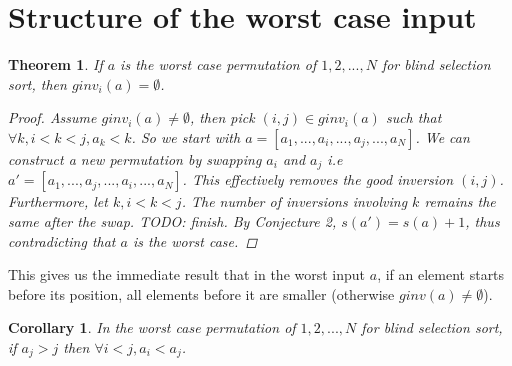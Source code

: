 \documentclass{article}
\newtheorem{theorem}{Theorem}
\newtheorem{corollary}{Corollary}
\begin{document}
\section{Structure of the worst case input}
\begin{theorem}
    If $a$ is the worst case permutation of $1, 2, ..., N$ for blind selection sort, then $ginv_i(a) = \emptyset$.
    \begin{proof}
        Assume $ginv_i(a) \neq \emptyset$, then pick $(i, j) \in ginv_i(a)$ such that $\forall k, i < k < j, a_k < k$.
        So we start with $a = [a_1, ... , a_i, ...,  a_j, ..., a_N]$. We can construct a new permutation by swapping $a_i$ and $a_j$
        i.e $a' = [a_1, ... , a_j, ...,  a_i, ..., a_N]$. This effectively removes the good inversion $(i, j)$.
        Furthermore, let $k, i < k < j$. The number of inversions involving $k$ remains the same after the swap. TODO: finish.
        By Conjecture 2, $s(a') = s(a) + 1$, thus contradicting that $a$ is the worst case.
    \end{proof}
\end{theorem}
This gives us the immediate result that in the worst input $a$, if an element starts before its position, all elements before it are smaller (otherwise $ginv(a) \neq \emptyset$).
\begin{corollary}
    In the worst case permutation of $1, 2, ... , N$ for blind selection sort, if $a_j > j$ then $\forall i < j, a_i < a_j$.
\end{corollary}
\end{document}
